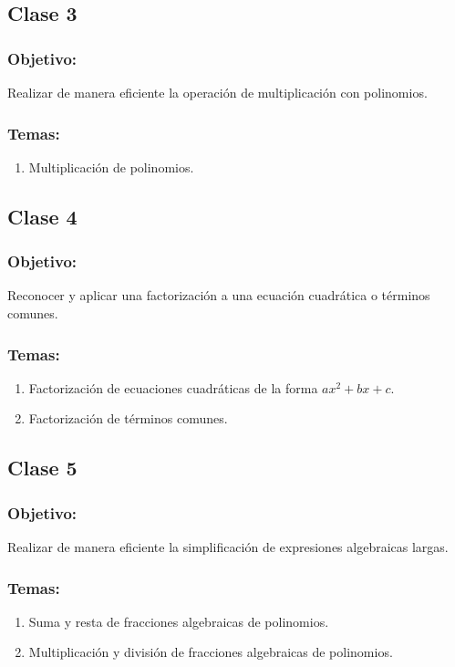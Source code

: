 \documentclass[12pt,letterpaper]{report}
\begin{document}
\subsection*{Clase 3}
\subsubsection*{Objetivo:}
Realizar de manera eficiente la operación de multiplicación con polinomios.
\subsubsection*{Temas:}
\begin{enumerate}
    \item Multiplicación de polinomios.
\end{enumerate}
\pagebreak
\subsection*{Clase 4}
\subsubsection*{Objetivo:}
Reconocer y aplicar una factorización a una ecuación cuadrática o términos comunes.
\subsubsection*{Temas:}
\begin{enumerate}
    \item Factorización de ecuaciones cuadráticas de la forma $ax^2+bx+c$.
    \item Factorización de términos comunes.
\end{enumerate}
\subsection*{Clase 5}
\subsubsection*{Objetivo:}
Realizar de manera eficiente la simplificación de expresiones algebraicas largas.
\subsubsection*{Temas:}
\begin{enumerate}
    \item Suma y resta de fracciones algebraicas de polinomios.
    \item Multiplicación y división de fracciones algebraicas de polinomios.
\end{enumerate}
\end{document}
